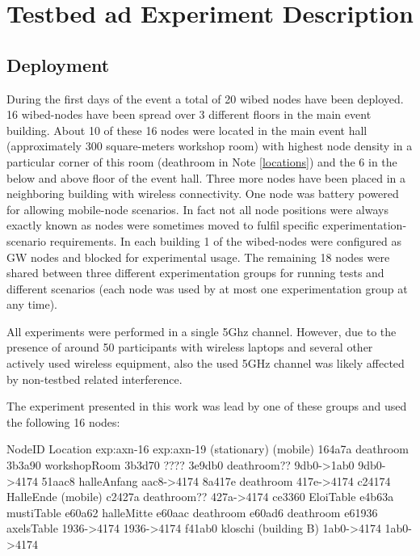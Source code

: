 \documentclass[a4paper,12pt,twoside]{article}
\begin{document}
\section{Testbed ad Experiment Description}

\subsection{Deployment}

During the first days of the event a total of 20 wibed nodes have been
deployed. 16 wibed-nodes have been spread over 3 different floors in
the main event building. About 10 of these 16 nodes were located in
the main event hall (approximately 300 square-meters workshop room)
with highest node density in a particular corner of this room
(deathroom in Note \ref{locations}) and the 6 in the below and above floor of the event
hall. Three more nodes have been placed in a neighboring building with
wireless connectivity.  One node was battery powered for allowing
mobile-node scenarios.  In fact not all node positions were always
exactly known as nodes were sometimes moved to fulfil specific
experimentation-scenario requirements.  In each building 1 of the
wibed-nodes were configured as GW nodes and blocked for experimental
usage. The remaining 18 nodes were shared between three different
experimentation groups for running tests and different scenarios (each
node was used by at most one experimentation group at any time).

All experiments were performed in a single 5Ghz channel. However, due
to the presence of around 50 participants with wireless laptops and
several other actively used wireless equipment, also the used 5GHz
channel was likely affected by non-testbed related interference.

The experiment presented in this work was lead by one of these groups
and used the following 16 nodes:

\begin{rawtext}[caption={Node locations and experiment usage}, label=locations]
NodeID  Location               exp:axn-16   exp:axn-19
                               (stationary) (mobile)
164a7a  deathroom
3b3a90  workshopRoom
3b3d70  ????
3e9db0  deathroom??            9db0->1ab0  9db0->4174
51aac8  halleAnfang                        aac8->4174
8a417e  deathroom              417e->4174   
c24174  HalleEnde (mobile)                  
c2427a  deathroom??                        427a->4174
ce3360  EloiTable
e4b63a  mustiTable
e60a62  halleMitte
e60aac  deathroom
e60ad6  deathroom
e61936  axelsTable             1936->4174  1936->4174
f41ab0  kloschi (building B)   1ab0->4174  1ab0->4174
\end{rawtext}
\end{document}
